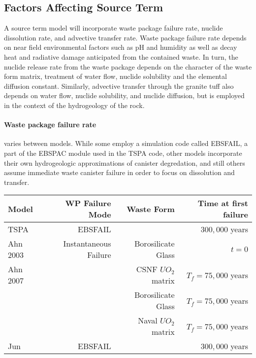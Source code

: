 \subsection{Factors Affecting Source Term}
A source term model will incorporate waste package failure rate, nuclide dissolution rate, and 
advective transfer rate. Waste package failure rate depends on near field environmental factors such 
as pH and humidity as well as decay heat and radiative damage anticipated from the contained waste. 
In turn, the nuclide release rate from the waste package depends on the character of the waste form 
matrix, treatment of water flow, nuclide solubility and the elemental diffusion constant. Similarly, 
advective transfer through the granite tuff also depends on water flow, nuclide solubility, and 
nuclide diffusion, but is employed in the context of the hydrogeology of the rock.   
\paragraph{Waste package failure rate} varies between models. While some employ a simulation code 
called EBSFAIL, a part of the EBSPAC module used in the TSPA code, other models incorporate their 
own hydrogeologic approximations of canister degredation, and still others assume immediate waste 
canister failure in order to focus on dissolution and transfer.  \newline
\begin{centering}
\begin{table}
\begin{tabular}[h!bt]{l|r|r|r}
Model&WP Failure Mode&Waste Form&Time at first failure\\
\hline
TSPA&EBSFAIL&&$300,000$ years\\
\hline
Ahn 2003&Instantaneous Failure&Borosilicate Glass&$t=0$\\
\hline
Ahn 2007& &CSNF $UO_2$ matrix &$T_f=75,000$ years\\
& &Borosilicate Glass &$T_f=75,000$ years\\
& & Naval $UO_2$ matrix &$T_f=75,000$ years\\
\hline
Jun&EBSFAIL&&$300,000$ years\\
\end{tabular}
\end{table}
\end{centering}
